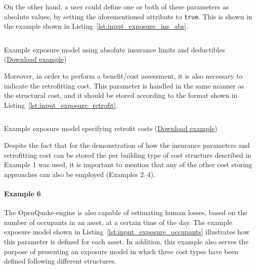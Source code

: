On the other hand, a user could define one or both of these parameters as
absolute values, by setting the aforementioned attribute to \Verb+true+. This
is shown in the example shown in Listing~\ref{lst:input_exposure_ins_abs}.

\begin{listing}[htbp]
  \inputminted[firstline=1,firstnumber=1,fontsize=\footnotesize,frame=single,linenos,bgcolor=lightgray]{xml}{oqum/risk/Verbatim/input_exposure_ins_abs.xml}
  \caption{Example exposure model using absolute insurance limits and deductibles (\href{https://raw.githubusercontent.com/GEMScienceTools/oq-engine-docs/master/oqum/risk/verbatim/input_exposure_ins_abs.xml}{Download example})}
  \label{lst:input_exposure_ins_abs}
\end{listing}

Moreover, in order to perform a benefit/cost assessment, it is also necessary
to indicate the retrofitting cost. This parameter is handled in the same
manner as the structural cost, and it should be stored according to the format
shown in Listing~\ref{lst:input_exposure_retrofit}.

\begin{listing}[htbp]
  \inputminted[firstline=1,firstnumber=1,fontsize=\footnotesize,frame=single,linenos,bgcolor=lightgray]{xml}{oqum/risk/Verbatim/input_exposure_retrofit.xml}
  \caption{Example exposure model specifying retrofit costs (\href{https://raw.githubusercontent.com/GEMScienceTools/oq-engine-docs/master/oqum/risk/verbatim/input_exposure_retrofit.xml}{Download example})}
  \label{lst:input_exposure_retrofit}
\end{listing}

Despite the fact that for the demonstration of how the insurance parameters
and retrofitting cost can be stored the per building type of cost structure
described in Example 1 was used, it is important to mention that any of the
other cost storing approaches can also be employed (Examples 2--4).


\paragraph{Example 6}

The OpenQuake-engine is also capable of estimating human losses, based on the
number of occupants in an asset, at a certain time of the day. The example
exposure model shown in Listing~\ref{lst:input_exposure_occupants} illustrates
how this parameter is defined for each asset. In addition, this example also
serves the purpose of presenting an \gls{exposure model} in which three cost
types have been defined following different structures.

